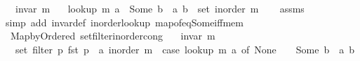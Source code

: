 \begin{isabellebody}
\ \ \ {\isachardoublequoteopen}invar\ m{\isachardoublequoteclose}\isanewline
\ \ \ {\isachardoublequoteopen}lookup\ m\ a\ {\isacharequal}{\kern0pt}\ Some\ b\ {\isasymlongleftrightarrow}\ {\isacharparenleft}{\kern0pt}a{\isacharcomma}{\kern0pt}\ b{\isacharparenright}{\kern0pt}\ {\isasymin}\ set\ {\isacharparenleft}{\kern0pt}inorder\ m{\isacharparenright}{\kern0pt}{\isachardoublequoteclose}\isanewline
%
\isadelimproof
\ \ %
\endisadelimproof
%
\isatagproof
{}\isamarkupfalse%
\ assms\isanewline
\ \ \isamarkupfalse%
\ {\isacharparenleft}{\kern0pt}simp\ add{\isacharcolon}{\kern0pt}\ invar{\isacharunderscore}{\kern0pt}def\ inorder{\isacharunderscore}{\kern0pt}lookup\ map{\isacharunderscore}{\kern0pt}of{\isacharunderscore}{\kern0pt}eq{\isacharunderscore}{\kern0pt}Some{\isacharunderscore}{\kern0pt}iff{\isacharunderscore}{\kern0pt}mem{\isacharparenright}{\kern0pt}%
\endisatagproof
{\isafoldproof}%
%
\isadelimproof
\isanewline
%
\endisadelimproof
%
\isadeliminvisible
\isanewline
%
\endisadeliminvisible
%
\isataginvisible
{}\isamarkupfalse%
\ {\isacharparenleft}{\kern0pt}\ Map{\isacharunderscore}{\kern0pt}by{\isacharunderscore}{\kern0pt}Ordered{\isacharparenright}{\kern0pt}\ set{\isacharunderscore}{\kern0pt}filter{\isacharunderscore}{\kern0pt}inorder{\isacharunderscore}{\kern0pt}cong{\isacharcolon}{\kern0pt}\isanewline
\ \ \ {\isachardoublequoteopen}invar\ m{\isachardoublequoteclose}\isanewline
\ \ \ {\isachardoublequoteopen}set\ {\isacharparenleft}{\kern0pt}filter\ {\isacharparenleft}{\kern0pt}{\isasymlambda}p{\isachardot}{\kern0pt}\ fst\ p\ {\isacharequal}{\kern0pt}\ a{\isacharparenright}{\kern0pt}\ {\isacharparenleft}{\kern0pt}inorder\ m{\isacharparenright}{\kern0pt}{\isacharparenright}{\kern0pt}\ {\isacharequal}{\kern0pt}\ {\isacharparenleft}{\kern0pt}case\ lookup\ m\ a\ of\ None\ {\isasymRightarrow}\ {\isacharbraceleft}{\kern0pt}{\isacharbraceright}{\kern0pt}\ {\isacharbar}{\kern0pt}\ Some\ b\ {\isasymRightarrow}\ {\isacharbraceleft}{\kern0pt}{\isacharparenleft}{\kern0pt}a{\isacharcomma}{\kern0pt}\ b{\isacharparenright}{\kern0pt}{\isacharbraceright}{\kern0pt}{\isacharparenright}{\kern0pt}{\isachardoublequoteclose}%
\endisataginvisible
{\isafoldinvisible}%
%
\isadeliminvisible
\isanewline
%
\endisadeliminvisible
%
\isadelimproof
%
\endisadelimproof
%
\isatagproof
{}\isamarkupfalse%
\ {\isacharminus}{\kern0pt}\isanewline
\ \ \isacommand{{\isacharbraceleft}{\kern0pt}}\isamarkupfalse%
\ \isamarkupfalse%

\end{isabellebody}
